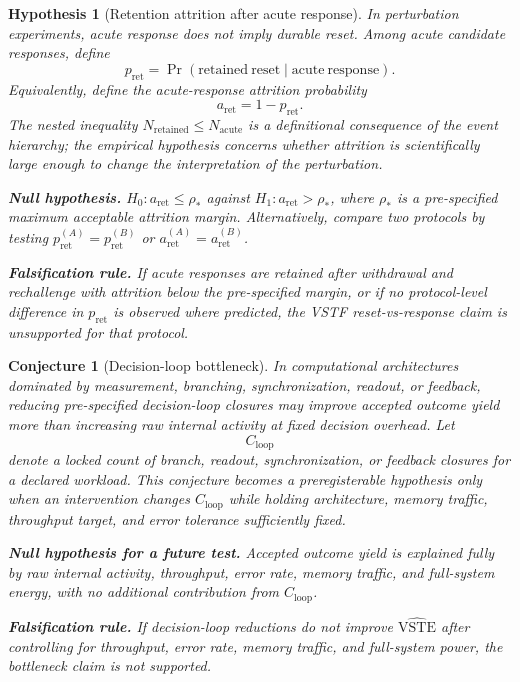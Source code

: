 \documentclass[11pt,a4paper]{article}
\newtheorem{hypothesis}{Hypothesis}
\newtheorem{conjecture}{Conjecture}
\newcommand{\VSTE}{\ensuremath{\mathrm{VSTE}}}
\newcommand{\1}{\mathbf{1}}
\begin{document}
\begin{hypothesis}[Retention attrition after acute response]
In perturbation experiments, acute response does not imply durable reset. Among acute candidate responses, define
\[
  p_{\mathrm{ret}}=\Pr(\mathrm{retained\ reset}\mid \mathrm{acute\ response}).
\]
Equivalently, define the acute-response attrition probability
\[
  a_{\mathrm{ret}}=1-p_{\mathrm{ret}}.
\]
The nested inequality $N_{\mathrm{retained}}\leq N_{\mathrm{acute}}$ is a definitional consequence of the event hierarchy; the empirical hypothesis concerns whether attrition is scientifically large enough to change the interpretation of the perturbation.

\noindent\textbf{Null hypothesis.} $H_0:a_{\mathrm{ret}}\leq\rho_\ast$ against $H_1:a_{\mathrm{ret}}>\rho_\ast$, where $\rho_\ast$ is a pre-specified maximum acceptable attrition margin. Alternatively, compare two protocols by testing $p_{\mathrm{ret}}^{(A)}=p_{\mathrm{ret}}^{(B)}$ or $a_{\mathrm{ret}}^{(A)}=a_{\mathrm{ret}}^{(B)}$.

\noindent\textbf{Falsification rule.} If acute responses are retained after withdrawal and rechallenge with attrition below the pre-specified margin, or if no protocol-level difference in $p_{\mathrm{ret}}$ is observed where predicted, the VSTF reset-vs-response claim is unsupported for that protocol.
\end{hypothesis}

\begin{conjecture}[Decision-loop bottleneck]
In computational architectures dominated by measurement, branching, synchronization, readout, or feedback, reducing pre-specified decision-loop closures may improve accepted outcome yield more than increasing raw internal activity at fixed decision overhead. Let
\[
  C_{\mathrm{loop}}
\]
denote a locked count of branch, readout, synchronization, or feedback closures for a declared workload. This conjecture becomes a preregisterable hypothesis only when an intervention changes $C_{\mathrm{loop}}$ while holding architecture, memory traffic, throughput target, and error tolerance sufficiently fixed.

\noindent\textbf{Null hypothesis for a future test.} Accepted outcome yield is explained fully by raw internal activity, throughput, error rate, memory traffic, and full-system energy, with no additional contribution from $C_{\mathrm{loop}}$.

\noindent\textbf{Falsification rule.} If decision-loop reductions do not improve $\widehat{\VSTE}$ after controlling for throughput, error rate, memory traffic, and full-system power, the bottleneck claim is not supported.
\end{conjecture}
\end{document}
